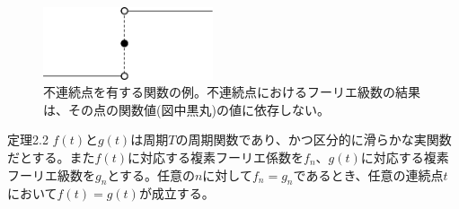 \documentclass[dvipdfmx, 9pt, a4paper]{jsarticle}
\begin{document}
\begin{figure}[b]
\begin{center}
\includegraphics[width=5cm]{fig5.png}
\caption{不連続点を有する関数の例。不連続点におけるフーリエ級数の結果は、その点の関数値(図中黒丸)の値に依存しない。}
\end{center}
\end{figure}

\begin{itembox}[l]{定理2.2}
$f(t)$と$g(t)$は周期$T$の周期関数であり、かつ区分的に滑らかな実関数だとする。また$f(t)$に対応する複素フーリエ係数を$f_n$、$g(t)$に対応する複素フーリエ級数を$g_n$とする。任意の$n$に対して$f_n=g_n$であるとき、任意の連続点$t$において$f(t)=g(t)$が成立する。
\end{itembox}
\end{document}
